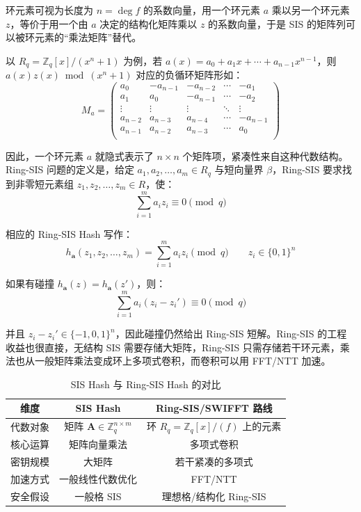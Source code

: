 \documentclass{article}
\begin{document}
环元素可视为长度为 $n=\deg f$ 的系数向量，用一个环元素 $a$ 乘以另一个环元素 $z$，等价于用一个由 $a$ 决定的结构化矩阵乘以 $z$ 的系数向量，于是 SIS 的矩阵列可以被环元素的“乘法矩阵”替代。

以 $R_q=\mathbb{Z}_q[x]/(x^n+1)$ 为例，若 $a(x)=a_0+a_1x+\cdots+a_{n-1}x^{n-1}$，则 $a(x)z(x)\bmod(x^n+1)$ 对应的负循环矩阵形如：
\[ M_a=\begin{pmatrix}
    a_0      & -a_{n-1} & -a_{n-2} & \cdots & -a_1\\
    a_1      & a_0      & -a_{n-1} & \cdots & -a_2\\
    \vdots   & \vdots   & \vdots   & \ddots & \vdots\\
    a_{n-2}  & a_{n-3}  & a_{n-4}  & \cdots & -a_{n-1}\\
    a_{n-1}  & a_{n-2}  & a_{n-3}  & \cdots & a_0 \\
\end{pmatrix} \]

因此，一个环元素 $a$ 就隐式表示了 $n\times n$ 个矩阵项，紧凑性来自这种代数结构。Ring-SIS 问题的定义是，给定 $a_1,a_2,\ldots,a_m\in R_q$ 与短向量界 $\beta$，Ring-SIS 要求找到非零短元素组 $z_1,z_2,\ldots,z_m\in R$，使：
\[ \sum_{i=1}^{m}a_iz_i\equiv0\pmod q \]

相应的 Ring-SIS Hash 写作：
\[ h_{\bm{a}}(z_1,z_2,\ldots,z_m)=\sum_{i=1}^{m}a_iz_i\pmod q\qquad z_i\in\{0,1\}^{n} \]

如果有碰撞 $h_{\bm{a}}(z)=h_{\bm{a}}(z')$，则：
\[ \sum_{i=1}^{m}a_i(z_i-z_i')\equiv0\pmod q \]

并且 $z_i-z_i'\in\{-1,0,1\}^n$，因此碰撞仍然给出 Ring-SIS 短解。Ring-SIS 的工程收益也很直接，无结构 SIS 需要存储大矩阵，Ring-SIS 只需存储若干环元素，乘法也从一般矩阵乘法变成环上多项式卷积，而卷积可以用 FFT/NTT 加速。

\begin{table}[H]
    \centering
    \renewcommand{\arraystretch}{1.5}
    \setlength{\tabcolsep}{16pt}
    \caption{SIS Hash 与 Ring-SIS Hash 的对比}
    \begin{tabular}{ccc}
        \toprule[1.5pt]
        维度 & SIS Hash & Ring-SIS/SWIFFT 路线 \\
        \midrule[0.75pt]
        代数对象 & 矩阵 $\bm{A}\in\mathbb{Z}_{q}^{n\times m}$ & 环 $R_q=\mathbb{Z}_q[x]/(f)$ 上的元素 \\
        核心运算 & 矩阵向量乘法 & 多项式卷积 \\
        密钥规模 & 大矩阵 & 若干紧凑的多项式 \\
        加速方式 & 一般线性代数优化 & FFT/NTT \\
        安全假设 & 一般格 SIS & 理想格/结构化 Ring-SIS \\
        \bottomrule[1.5pt]
    \end{tabular}
\end{table}
\end{document}

